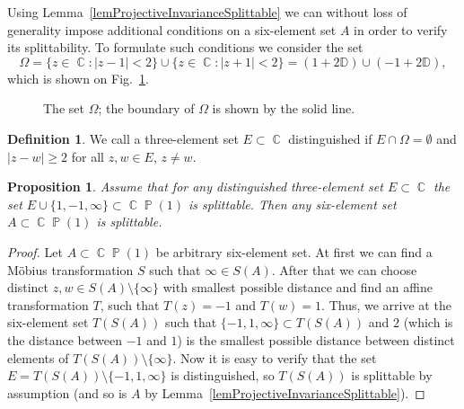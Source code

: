 \documentclass{amsart}
\numberwithin{equation}{section}
\newtheorem{proposition}[theorem]{Proposition}
\theoremstyle{definition}
\newtheorem{definition}[theorem]{Definition}
\theoremstyle{remark}
\DeclareMathOperator{\CC}{\mathbb C}
\DeclareMathOperator{\PP}{\mathbb P}
\begin{document}
	Using Lemma~\ref{lemProjectiveInvarianceSplittable} we can without loss of generality impose additional conditions on a six-element set $A$ in order to verify its splittability. To formulate such conditions we consider the set
	\[
	\Omega = \{z \in \CC: |z - 1| < 2\} \cup \{z \in \CC: |z + 1| < 2\} = (1 + 2\mathbb D) \cup (-1 + 2\mathbb D),
	\]
	which is shown on Fig.~\ref{figOmega}.
	\begin{figure}
	\caption{The set $\Omega$; the boundary of $\Omega$ is shown by the solid line.}
	\label{figOmega}
	\end{figure}
	\begin{definition}
		We call a three-element set $E \subset \CC$ distinguished if $E \cap \Omega = \emptyset$ and $|z - w| \ge 2$ for all $z,w \in E$, $z \ne w$.
	\end{definition}
	\begin{proposition}\label{propReductionToSharp}
		Assume that for any distinguished three-element set $E \subset \CC$ the set $E \cup \{1, -1, \infty\} \subset \CC\PP(1)$ is splittable. Then any six-element set $A \subset \CC\PP(1)$ is splittable.
	\end{proposition}
	\begin{proof}
		Let $A \subset \CC\PP(1)$ be arbitrary six-element set. At first we can find a M\"obius transformation $S$ such that $\infty \in S(A)$. After that we can choose distinct $z,w \in S(A)\setminus \{\infty\}$ with smallest possible distance and find an affine transformation $T$, such that $T(z) = -1$ and $T(w) = 1$. Thus, we arrive at the six-element set $T(S(A))$ such that $\{-1, 1, \infty\} \subset T(S(A))$ and $2$ (which is the distance between $-1$ and $1$) is the smallest possible distance between distinct elements of $T(S(A)) \setminus\{\infty\}$. Now it is easy to verify that the set $E = T(S(A)) \setminus \{-1, 1, \infty\}$ is distinguished, so $T(S(A))$ is splittable by assumption (and so is $A$ by Lemma~\ref{lemProjectiveInvarianceSplittable}).
	\end{proof}
	
\end{document}
